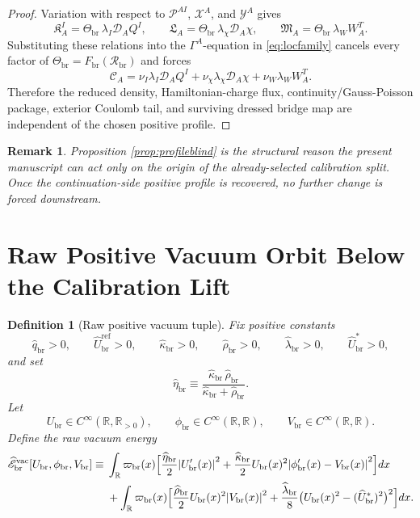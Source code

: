\documentclass[11pt]{article}
\newcommand{\SpatialD}{\mathcal D}
\newcommand{\ConstCurrent}{\mathcal C}
\newcommand{\ConstGamma}{\Gamma}
\newcommand{\CurvQMult}{\mathscr P}
\newcommand{\CurvChiMult}{\mathscr X}
\newcommand{\CurvTransMult}{\mathscr Y}
\newcommand{\CurvSeed}{\Theta_{\mathrm{br}}}
\newcommand{\CurvProfile}{F_{\mathrm{br}}}
\newcommand{\CurvOneI}{\mathfrak K}
\newcommand{\CurvOneChi}{\mathfrak L}
\newcommand{\CurvOneW}{\mathfrak M}
\newcommand{\BridgeCurv}{\mathcal R_{\mathrm{br}}}
\newcommand{\ProfWeight}{\varpi_{\mathrm{br}}}
\newcommand{\RespVacAmp}{U_{\mathrm{br}}}
\newcommand{\RespVacPhase}{\phi_{\mathrm{br}}}
\newcommand{\RespVacCarrier}{V_{\mathrm{br}}}
\newcommand{\RespRawReadout}{\widehat q_{\mathrm{br}}}
\newcommand{\RespRawRef}{\widehat U_{\mathrm{br}}^{\mathrm{ref}}}
\newcommand{\RespRawCov}{\widehat\kappa_{\mathrm{br}}}
\newcommand{\RespRawRelax}{\widehat\rho_{\mathrm{br}}}
\newcommand{\RespRawWell}{\widehat\lambda_{\mathrm{br}}}
\newcommand{\RespRawEq}{\widehat U_{\mathrm{br}}^{\ast}}
\newcommand{\RespRawIso}{\widehat\eta_{\mathrm{br}}}
\newcommand{\RespRawEnergy}{\widehat{\mathscr E}_{\mathrm{br}}^{\mathrm{vac}}}
\newtheorem{definition}{Definition}
\newtheorem{remark}{Remark}
\begin{document}
\begin{proof}
Variation with respect to \(\CurvQMult^{AI}\), \(\CurvChiMult^A\), and \(\CurvTransMult^A\) gives
\[
\CurvOneI_A^I=\CurvSeed\,\lambda_I\SpatialD_AQ^I,
\qquad
\CurvOneChi_A=\CurvSeed\,\lambda_\chi\SpatialD_A\chi,
\qquad
\CurvOneW_A=\CurvSeed\,\lambda_WW_A^T.
\]
Substituting these relations into the \(\ConstGamma^A\)-equation in \eqref{eq:locfamily} cancels every factor of \(\CurvSeed=\CurvProfile(\BridgeCurv)\) and forces
\[
\ConstCurrent_A
=
\nu_I\lambda_I\SpatialD_AQ^I
+\nu_\chi\lambda_\chi\SpatialD_A\chi
+\nu_W\lambda_WW_A^T.
\]
Therefore the reduced density, Hamiltonian-charge flux, continuity/Gauss-Poisson package, exterior Coulomb tail, and surviving dressed bridge map are independent of the chosen positive profile.
\end{proof}

\begin{remark}
Proposition \ref{prop:profileblind} is the structural reason the present manuscript can act only on the origin of the already-selected calibration split. Once the continuation-side positive profile is recovered, no further change is forced downstream.
\end{remark}

\section{Raw Positive Vacuum Orbit Below the Calibration Lift}

\begin{definition}[Raw positive vacuum tuple]
\label{def:rawtuple}
Fix positive constants
\begin{equation}
\RespRawReadout>0,
\qquad
\RespRawRef>0,
\qquad
\RespRawCov>0,
\qquad
\RespRawRelax>0,
\qquad
\RespRawWell>0,
\qquad
\RespRawEq>0,
\label{eq:rawconstants}
\end{equation}
and set
\begin{equation}
\RespRawIso\equiv\frac{\RespRawCov\,\RespRawRelax}{\RespRawCov+\RespRawRelax}.
\label{eq:rawiso}
\end{equation}
Let
\begin{equation}
\RespVacAmp\in C^\infty(\mathbb R,\mathbb R_{>0}),
\qquad
\RespVacPhase\in C^\infty(\mathbb R,\mathbb R),
\qquad
\RespVacCarrier\in C^\infty(\mathbb R,\mathbb R).
\label{eq:rawfields}
\end{equation}
Define the raw vacuum energy
\begin{align}
\RespRawEnergy[\RespVacAmp,\RespVacPhase,\RespVacCarrier]
\equiv\;&
\int_{\mathbb R}\ProfWeight(x)\Bigl[
\frac{\RespRawIso}{2}\abs{\RespVacAmp'(x)}^2
+
\frac{\RespRawCov}{2}\RespVacAmp(x)^2\abs{\RespVacPhase'(x)-\RespVacCarrier(x)}^2
\Bigr]dx
\nonumber\\
&+
\int_{\mathbb R}\ProfWeight(x)\Bigl[
\frac{\RespRawRelax}{2}\RespVacAmp(x)^2\abs{\RespVacCarrier(x)}^2
+
\frac{\RespRawWell}{8}\bigl(\RespVacAmp(x)^2-(\RespRawEq)^2\bigr)^2
\Bigr]dx.
\label{eq:rawenergy}
\end{align}
\end{definition}
\end{document}
